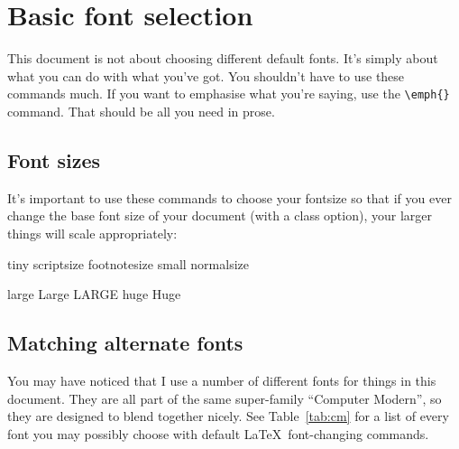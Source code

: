 \documentclass[12pt,article]{memoir}
\begin{document}
\chapter*{Basic font selection}

This document is not about choosing different default fonts. It's simply about
what you can do with what you've got. You shouldn't have to use these commands
much. If you want to emphasise what you're saying, use the \verb|\emph{}|
command. That should be all you need in prose.

\section*{Font sizes}

It's important to use these commands to choose your fontsize so that if you ever
change the base font size of your document (with a class option), your larger
things will scale appropriately:

\begin{center}
  \tiny tiny
  \scriptsize scriptsize
  \footnotesize footnotesize
  \small small
  \normalsize normalsize
        
  \large large
  \Large Large
  \LARGE LARGE
  \huge huge
  \Huge Huge
\end{center}

\section*{Matching alternate fonts}

You may have noticed that I use a number of different fonts for things in this
document. They are all part of the same super-family ``Computer Modern'', so
they are designed to blend together nicely. See Table~\ref{tab:cm} for a list of
every font you may possibly choose with default \LaTeX\ font-changing commands.
\end{document}
